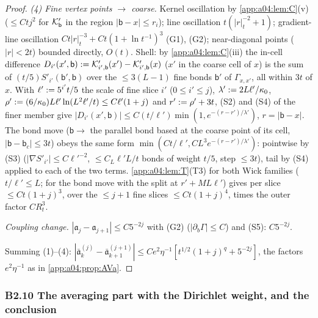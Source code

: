 \begin{proof}
\emph{(4) Fine vertex points $\to$ coarse.} Kernel oscillation by \cref{app:a04:lem:C}(v) ($\le Ctj^2$ for $\mathcal K'_{\mathsf b}$ in the region $|\mathsf b-x|\le r_i$); line oscillation $t(|r|_t^{-2}+1)$; gradient-line oscillation $Ct|r|_t^{-3}+Ct(1+\ln t^{-1})^3$ (G1), (G2); near-diagonal points ($|r|<2t$) bounded directly, $O(t)$. Shell: by \cref{app:a04:lem:C}(iii) the in-cell difference $D_{i'}(x',\mathsf b):=\mathcal K'_{i',\mathsf b}(x')-\mathcal K'_{i',\mathsf b}(x)$ ($x'$ in the coarse cell of $x$) is the sum of $(t/5)S'_{i'}(\mathsf b',\mathsf b)$ over the $\le3(L-1)$ fine bonds $\mathsf b'$ of $\Gamma_{x,x'}$, all within $3t$ of $x$. With $\ell':=5^{i'}t/5$ the scale of fine slice $i'$ ($0\le i'\le j$), $\lambda':=2L\ell'/\kappa_0$, $\rho':=(6/\kappa_0)L\ell'\ln(L^2\ell'/t)\le C\ell'(1+j)$ and $r':=\rho'+3t$, (S2) and (S4) of the finer member give $|D_{i'}(x',\mathsf b)|\le C(t/\ell')\min(1,e^{-(r-r')/\lambda'})$, $r=|\mathsf b-x|$. The bond move ($\mathsf b\to$ the parallel bond based at the coarse point of its cell, $|\mathsf b-\mathsf b_c|\le3t$) obeys the same form $\min(Ct/\ell',CL^3e^{-(r-r')/\lambda'})$: pointwise by (S3) ($|\nabla S'_{i'}|\le C\ell'^{-2}$, $\le C_L\ell'L/t$ bonds of weight $t/5$, step $\le3t$), tail by (S4) applied to each of the two terms. \cref{app:a04:lem:T}(T3) for both Wick families ($t/\ell'\le L$; for the bond move with the split at $r'+ML\ell'$) gives per slice $\le Ct(1+j)^3$, over the $\le j+1$ fine slices $\le Ct(1+j)^4$, times the outer factor $CR_t^3$.

\emph{Coupling change.} $|\mathfrak a_j-\mathfrak a_{j+1}|\le C5^{-2j}$ with (G2) ($|\partial_b\Gamma|\le C$) and (S5): $C5^{-2j}$.

Summing (1)--(4): $|\bar{\mathfrak a}^{(j)}_k-\bar{\mathfrak a}^{(j+1)}_{k+1}|\le Ce^2\eta^{-1}[t^{1/2}(1+j)^q+5^{-2j}]$, the factors $e^2\eta^{-1}$ as in \cref{app:a04:prop:AVa}.
\end{proof}

\subsubsection*{B2.10 The averaging part with the Dirichlet weight, and the conclusion}

